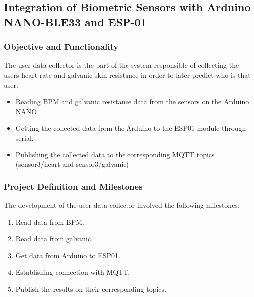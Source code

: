 \documentclass{article}
\begin{document}
\subsection{Integration of Biometric Sensors with Arduino NANO-BLE33 and ESP-01}

\subsubsection{Objective and Functionality}
The user data collector is the part of the system responsible of collecting the users heart rate and galvanic skin resistance in order to later predict who is that user.
\begin{itemize}
    \item Reading BPM and galvanic resistance data from the sensors on the Arduino NANO
    \item Getting the collected data from the Arduino to the ESP01 module through serial.
    \item Publishing the collected data to the corresponding MQTT topics (sensor3/heart and sensor3/galvanic)
\end{itemize}

\subsubsection{Project Definition and Milestones}
The development of the user data collector involved the following milestones:
\begin{enumerate}
    \item Read data from BPM.
    \item Read data from galvanic.
    \item Get data from Arduino to ESP01.
    \item Establishing connection with MQTT.
    \item Publish the results on their corresponding topics.
\end{enumerate}
\end{document}
